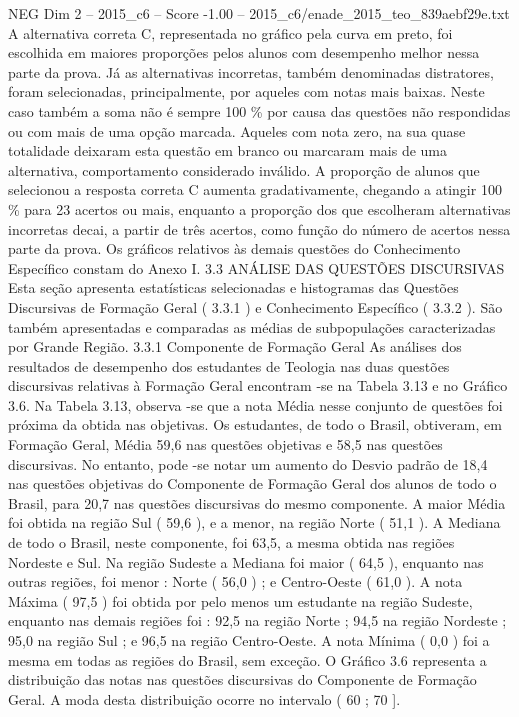 \begin{textsample}{NEG Dim 2 – 2015\_c6 – Score -1.00 – 2015\_c6/enade\_2015\_teo\_839aebf29e.txt}
A alternativa correta C, representada no gráfico pela curva em preto, foi escolhida em maiores proporções pelos alunos com desempenho melhor nessa parte da prova.
Já as alternativas incorretas, também denominadas distratores, foram selecionadas, principalmente, por aqueles com notas mais baixas.
Neste caso também a soma não é sempre 100 \% por causa das questões não respondidas ou com mais de uma opção marcada.
Aqueles com nota zero, na sua quase totalidade deixaram esta questão em branco ou marcaram mais de uma alternativa, comportamento considerado inválido.
A proporção de alunos que selecionou a resposta correta C aumenta gradativamente, chegando a atingir 100 \% para 23 acertos ou mais, enquanto a proporção dos que escolheram alternativas incorretas decai, a partir de três acertos, como função do número de acertos nessa parte da prova.
Os gráficos relativos às demais questões do Conhecimento Específico constam do Anexo I. 3.3 ANÁLISE DAS QUESTÕES DISCURSIVAS Esta seção apresenta estatísticas selecionadas e histogramas das Questões Discursivas de Formação Geral ( 3.3.1 ) e Conhecimento Específico ( 3.3.2 ).
São também apresentadas e comparadas as médias de subpopulações caracterizadas por Grande Região. 3.3.1 Componente de Formação Geral As análises dos resultados de desempenho dos estudantes de Teologia nas duas questões discursivas relativas à Formação Geral encontram -se na Tabela 3.13 e no Gráfico 3.6.
Na Tabela 3.13, observa -se que a nota Média nesse conjunto de questões foi próxima da obtida nas objetivas.
Os estudantes, de todo o Brasil, obtiveram, em Formação Geral, Média 59,6 nas questões objetivas e 58,5 nas questões discursivas.
No entanto, pode -se notar um aumento do Desvio padrão de 18,4 nas questões objetivas do Componente de Formação Geral dos alunos de todo o Brasil, para 20,7 nas questões discursivas do mesmo componente.
A maior Média foi obtida na região Sul ( 59,6 ), e a menor, na região Norte ( 51,1 ).
A Mediana de todo o Brasil, neste componente, foi 63,5, a mesma obtida nas regiões Nordeste e Sul.
Na região Sudeste a Mediana foi maior ( 64,5 ), enquanto nas outras regiões, foi menor : Norte ( 56,0 ) ; e Centro-Oeste ( 61,0 ).
A nota Máxima ( 97,5 ) foi obtida por pelo menos um estudante na região Sudeste, enquanto nas demais regiões foi : 92,5 na região Norte ; 94,5 na região Nordeste ; 95,0 na região Sul ; e 96,5 na região Centro-Oeste.
A nota Mínima ( 0,0 ) foi a mesma em todas as regiões do Brasil, sem exceção.
O Gráfico 3.6 representa a distribuição das notas nas questões discursivas do Componente de Formação Geral.
A moda desta distribuição ocorre no intervalo ( 60 ; 70 ].

\end{textsample}

